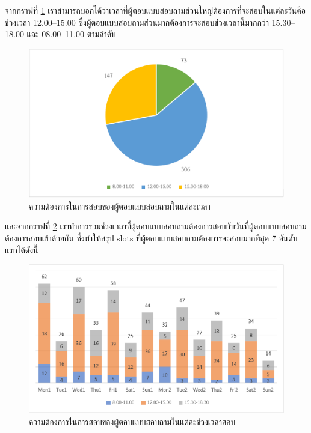 จากกราฟที่ \ref{fig:time} เราสามารถบอกได้ว่าเวลาที่ผู้ตอบแบบสอบถามส่วนใหญ่ต้องการที่จะสอบในแต่ละวันคือ
ช่วงเวลา 12.00--15.00 ซึ่งผู้ตอบแบบสอบถามส่วนมากต้องการจะสอบช่วงเวลานี้มากกว่า 15.30--18.00 และ 08.00--11.00 ตามลำดับ
%
\begin{figure}
  \begin{center}
    \includegraphics[width=\linewidth]{images/pie_chart_for_final_exam_time.png}
  \end{center}
  \caption{ความต้องการในการสอบของผู้ตอบแบบสอบถามในแต่ละเวลา}
  \label{fig:time}
\end{figure}
%
และจากกราฟที่ \ref{fig:time_slot} เราทำการรวมช่วงเวลาที่ผู้ตอบแบบสอบถามต้องการสอบกับวันที่ผู้ตอบแบบสอบถามต้องการสอบเข้าด้วยกัน ซึ่งทำให้สรุป slots ที่ผู้ตอบแบบสอบถามต้องการจะสอบมากที่สุด 7 อันดับแรกได้ดังนี้
\begin{figure}
  \begin{center}
    \includegraphics[width=\linewidth]{images/bar_chart_for_final_exam_slot.png}
  \end{center}
  \caption[ความต้องการในการสอบของผู้ตอบแบบสอบถามในแต่ละช่วงเวลาสอบ]{ความต้องการในการสอบของผู้ตอบแบบสอบถามในแต่ละช่วงเวลาสอบ}
  \label{fig:time_slot}     
\end{figure}
